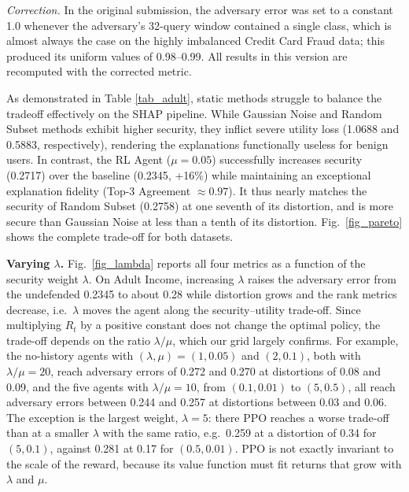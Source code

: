 \documentclass[conference]{IEEEtran}
\DeclareRobustCommand{\rev}[1]{{\color{blue}#1}}
\DeclareRobustCommand{\revnew}[1]{{\color{revpurple}#1}}
\begin{document}
\rev{\textit{Correction.} In the original submission, the adversary error was set to a constant 1.0 whenever the adversary's 32-query window contained a single class, which is almost always the case on the highly imbalanced Credit Card Fraud data; this produced its uniform values of 0.98--0.99. All results in this version are recomputed with the corrected metric.}

As demonstrated in Table \ref{tab_adult}, static methods struggle to balance the tradeoff effectively on the SHAP pipeline. While Gaussian Noise and Random Subset methods exhibit higher security, they inflict severe utility loss (\rev{1.0688 and 0.5883}, respectively), rendering the explanations functionally useless for benign users. In contrast, the RL Agent ($\mu=0.05$) successfully increases security (\rev{0.2717}) over the baseline (\rev{0.2345}, \rev{+16\%}) while maintaining an exceptional explanation fidelity (Top-3 Agreement $\approx 0.97$). \rev{It thus nearly matches the security of Random Subset (0.2758) at one seventh of its distortion, and is more secure than Gaussian Noise at less than a tenth of its distortion. Fig.~\ref{fig_pareto} shows the complete trade-off for both datasets.}

\rev{\textbf{Varying $\lambda$.} Fig.~\ref{fig_lambda} reports all four metrics as a function of the security weight $\lambda$. On Adult Income, increasing $\lambda$ raises the adversary error from the undefended 0.2345 to about 0.28 while distortion grows and the rank metrics decrease, i.e.\ $\lambda$ moves the agent along the security--utility trade-off. Since multiplying $R_t$ by a positive constant does not change the optimal policy, the trade-off depends on the ratio $\lambda/\mu$, which our grid \revnew{largely confirms. For example, the no-history agents with $(\lambda,\mu) = (1, 0.05)$ and $(2, 0.1)$, both with $\lambda/\mu=20$, reach adversary errors of 0.272 and 0.270 at distortions of 0.08 and 0.09, and the five agents with $\lambda/\mu=10$, from $(0.1, 0.01)$ to $(5, 0.5)$, all reach adversary errors between 0.244 and 0.257 at distortions between 0.03 and 0.06. The exception is the largest weight, $\lambda=5$: there PPO reaches a worse trade-off than at a smaller $\lambda$ with the same ratio, e.g.\ 0.259 at a distortion of 0.34 for $(5, 0.1)$, against 0.281 at 0.17 for $(0.5, 0.01)$. PPO is not exactly invariant to the scale of the reward, because its value function must fit returns that grow with $\lambda$ and $\mu$.}}
\end{document}
